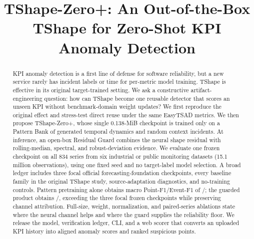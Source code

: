 \documentclass[conference]{IEEEtran}
\newcommand{\method}{TShape-Zero+}
\newcommand{\pfone}{Point-F1}
\newcommand{\efone}{Event-F1}
\begin{document}
\title{\method: An Out-of-the-Box TShape for Zero-Shot KPI Anomaly Detection}

\author{
}

\maketitle

\begin{abstract}
KPI anomaly detection is a first line of defense for software reliability, but a new service rarely has incident labels or time for per-metric model training. TShape is effective in its original target-trained setting. We ask a constructive artifact-engineering question: how can TShape become one reusable detector that scores an unseen KPI without benchmark-domain weight updates? We first reproduce the original effect and stress-test direct reuse under the same EasyTSAD metrics. We then propose \method{}, whose single 0.138-MiB checkpoint is trained only on a Pattern Bank of generated temporal dynamics and random context incidents. At inference, an open-box Residual Guard combines the neural shape residual with rolling-median, spectral, and robust-deviation evidence. We evaluate one frozen checkpoint on all 834 series from six industrial or public monitoring datasets (15.1 million observations), using one fixed seed and no target-label model selection. A broad ledger includes three focal official forecasting-foundation checkpoints, every baseline family in the original TShape study, source-adaptation diagnostics, and no-training controls. Pattern pretraining alone obtains macro \pfone{}/\efone{} of \DirectMacroPoint{}/\DirectMacroEvent{}; the guarded product obtains \FinalMacroPoint{}/\FinalMacroEvent{}, exceeding the three focal frozen checkpoints while preserving channel attribution. Full-size, weight, normalization, and paired-series ablations state where the neural channel helps and where the guard supplies the reliability floor. We release the model, verification ledger, CLI, and a web scorer that converts an uploaded KPI history into aligned anomaly scores and ranked suspicious points.
\end{abstract}
\end{document}
